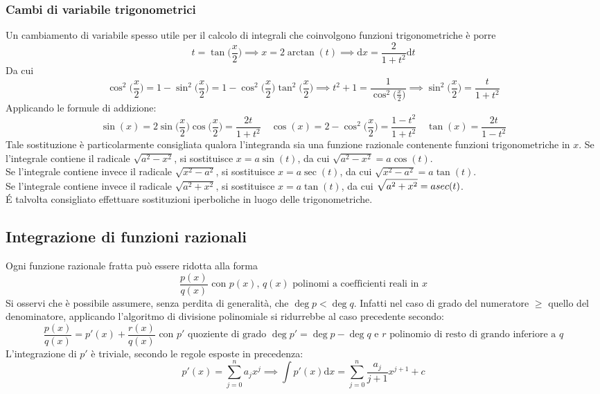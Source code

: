 \documentclass[10pt]{article}
\theoremstyle{plain}
\begin{document}
\subsubsection{Cambi di variabile trigonometrici}
Un cambiamento di variabile spesso utile per il calcolo di integrali che coinvolgono funzioni trigonometriche è porre
\[t = \tan\big(\frac{x}{2}\big) \implies x = 2 \arctan (t) \implies \textrm{d}x = \frac{2}{1+t^2}\textrm{d}t\]
Da cui
\[\cos^2\big(\frac{x}{2}\big) = 1 - \sin^2\big(\frac{x}{2}\big) = 1 - \cos^2\big(\frac{x}{2}\big) \tan^2\big(\frac{x}{2}\big) \implies t^2 + 1 = \frac{1}{\cos^2\big(\frac{x}{2}\big)} \implies \sin^2\big(\frac{x}{2}\big) = \frac{t}{1+t^2}\]
Applicando le formule di addizione:
\[\sin(x) = 2 \sin\big(\frac{x}{2}\big) \cos\big(\frac{x}{2}\big) = \frac{2t}{1+t^2} \quad \cos(x) = 2 - \cos^2\big(\frac{x}{2}\big) = \frac{1 - t^2}{1+t^2} \quad \tan(x) = \frac{2t}{1 - t^2}\]
Tale sostituzione è particolarmente consigliata qualora l'integranda sia una funzione razionale contenente funzioni trigonometriche in $x$.
Se l'integrale contiene il radicale $\displaystyle \sqrt{a^2 - x^2}$, si sostituisce $x = a \sin(t)$, da cui $\displaystyle \sqrt{a^2 - x^2} = a \cos(t)$.
\\Se l'integrale contiene invece il radicale $\displaystyle \sqrt{x^2 - a^2}$, si sostituisce $x = a \sec(t)$, da cui $\displaystyle \sqrt{x^2 - a^2} = a \tan(t)$.
\\Se l'integrale contiene invece il radicale $\displaystyle \sqrt{a^2 + x^2}$, si sostituisce $x = a \tan(t)$, da cui $\displaystyle \sqrt{a^2 + x^2} = a \\sec(t)$.
\\\'E talvolta consigliato effettuare sostituzioni iperboliche in luogo delle trigonometriche.


\subsection{Integrazione di funzioni razionali}
Ogni funzione razionale fratta può essere ridotta alla forma
\[\frac{p(x)}{q(x)} \textrm{  con $p(x)$, $q(x)$ polinomi a coefficienti reali in $x$}\]
Si osservi che è possibile assumere, senza perdita di generalità, che $\deg p < \deg q$. Infatti nel caso di grado del numeratore $\geq$ quello del denominatore, applicando l'algoritmo di divisione polinomiale si ridurrebbe al caso precedente secondo:
\[\frac{p(x)}{q(x)} = p'(x) + \frac{r(x)}{q(x)} \textrm{ con $p'$ quoziente di grado $\deg p' = \deg p - \deg q$ e $r$ polinomio di resto di grando inferiore a $q$}\]
L'integrazione di $p'$ è triviale, secondo le regole esposte in precedenza:
\[p'(x) = \sum \limits_{j=0}^{n}a_j x^j \implies \int p'(x) \textrm{d}x = \sum \limits_{j=0}^{n}\frac{a_j}{j+1} 
 x^{j+1} + c\]
\end{document}
